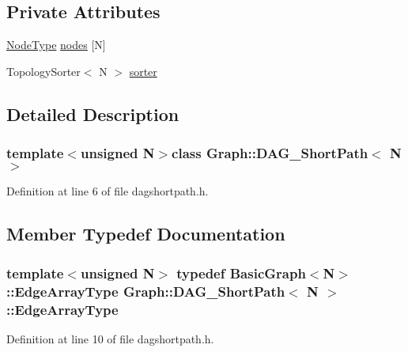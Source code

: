 \subsection*{Private Attributes}
\begin{DoxyCompactItemize}
\item 
\hyperlink{class_graph_1_1_d_a_g___short_path_a8f3964a826d60ad359488d56ad78f0e6}{Node\+Type} \hyperlink{class_graph_1_1_d_a_g___short_path_a7818ffaf2695c21ff4b44b65126f5897}{nodes} \mbox{[}N\mbox{]}
\item 
Topology\+Sorter$<$ N $>$ \hyperlink{class_graph_1_1_d_a_g___short_path_abc5a032ce3ec9a62f01d31447de4e2f2}{sorter}
\end{DoxyCompactItemize}


\subsection{Detailed Description}
\subsubsection*{template$<$unsigned N$>$class Graph\+::\+D\+A\+G\+\_\+\+Short\+Path$<$ N $>$}



Definition at line 6 of file dagshortpath.\+h.



\subsection{Member Typedef Documentation}
\hypertarget{class_graph_1_1_d_a_g___short_path_a27c383b64a1c96d6d62623c88e52722b}{}
\subsubsection[{Edge\+Array\+Type}]{\setlength{\rightskip}{0pt plus 5cm}template$<$unsigned N$>$ typedef Basic\+Graph$<$N$>$\+::{\bf Edge\+Array\+Type} {\bf Graph\+::\+D\+A\+G\+\_\+\+Short\+Path}$<$ N $>$\+::{\bf Edge\+Array\+Type}}\label{class_graph_1_1_d_a_g___short_path_a27c383b64a1c96d6d62623c88e52722b}


Definition at line 10 of file dagshortpath.\+h.

\hypertarget{class_graph_1_1_d_a_g___short_path_a8f3964a826d60ad359488d56ad78f0e6}{}
